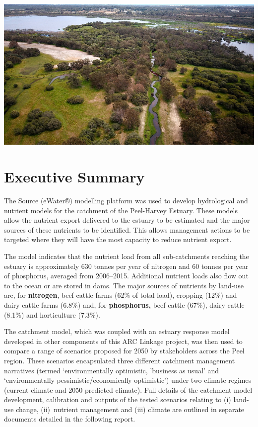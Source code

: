 \documentclass[
]{book}
\begin{document}
\includegraphics[width=1\linewidth]{images/catchment_model/picture1}

\hypertarget{executive-summary-6}{%
\section{Executive Summary}\label{executive-summary-6}}

The Source (eWater®) modelling platform was used to develop hydrological and nutrient models for the catchment of the Peel-Harvey Estuary. These models allow the nutrient export delivered to the estuary to be estimated and the major sources of these nutrients to be identified. This allows management actions to be targeted where they will have the most capacity to reduce nutrient export.~

The model indicates that the nutrient load from all sub-catchments reaching the estuary is approximately 630 tonnes per year of nitrogen and 60 tonnes per year of phosphorus, averaged from 2006--2015. Additional nutrient loads also flow out to the ocean or are stored in dams. The major sources of nutrients by land-use are, for \textbf{nitrogen}, beef cattle farms (62\% of total load), cropping (12\%) and dairy cattle farms (6.8\%) and, for \textbf{phosphorus,} beef cattle (67\%), dairy cattle (8.1\%) and horticulture (7.3\%).

The catchment model, which was coupled with an estuary response model developed in other components of this ARC Linkage project, was then used to compare a range of scenarios proposed for 2050 by stakeholders across the Peel region. These scenarios encapsulated three different catchment management narratives (termed `environmentally optimistic, 'business as usual' and `environmentally pessimistic/economically optimistic') under two climate regimes (current climate and 2050 predicted climate). Full details of the catchment model development, calibration and outputs of the tested scenarios relating to (i) land-use change, (ii)~nutrient management and (iii) climate are outlined in separate documents detailed in the following report.~
\end{document}
